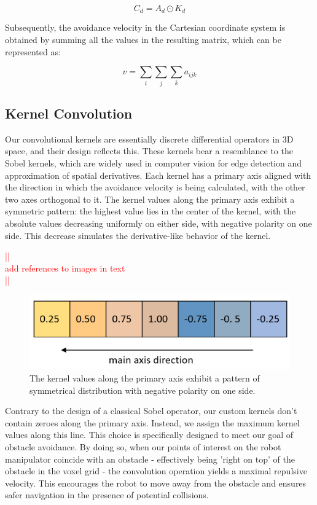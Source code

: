 \documentclass[a4paper]{article}
\newcommand\todocomment[1]{\textcolor{red}{||\\ #1\\||}}
\begin{document}
\[
C_d = A_d \odot K_d
\]

Subsequently, the avoidance velocity in the Cartesian coordinate system is obtained by summing all the values in the resulting matrix, which can be represented as:

\[
v = \sum_{i}\sum_{j}\sum_{k} a_{ijk} 
\]





\subsection{Kernel Convolution}

Our convolutional kernels are essentially discrete differential operators in 3D space, and their design reflects this. These kernels bear a resemblance to the Sobel kernels, which are widely used in computer vision for edge detection and approximation of spatial derivatives. Each kernel has a primary axis aligned with the direction in which the avoidance velocity is being calculated, with the other two axes orthogonal to it. The kernel values along the primary axis exhibit a symmetric pattern: the highest value lies in the center of the kernel, with the absolute values decreasing uniformly on either side, with negative polarity on one side. This decrease simulates the derivative-like behavior of the kernel.

\todocomment{add references to images in text}

\begin{figure}[H]
	\centering
	\includegraphics[width=0.8\linewidth]{kernel-mainvalues-colored.png}
	\caption{The kernel values along the primary axis exhibit a pattern of symmetrical distribution with negative polarity on one side.} 
	\label{Kernel main axis}
\end{figure}

Contrary to the design of a classical Sobel operator, our custom kernels don't contain zeroes along the primary axis. Instead, we assign the maximum kernel values along this line. This choice is specifically designed to meet our goal of obstacle avoidance. By doing so, when our points of interest on the robot manipulator coincide with an obstacle - effectively being 'right on top' of the obstacle in the voxel grid - the convolution operation yields a maximal repulsive velocity. This encourages the robot to move away from the obstacle and ensures safer navigation in the presence of potential collisions.
\end{document}
